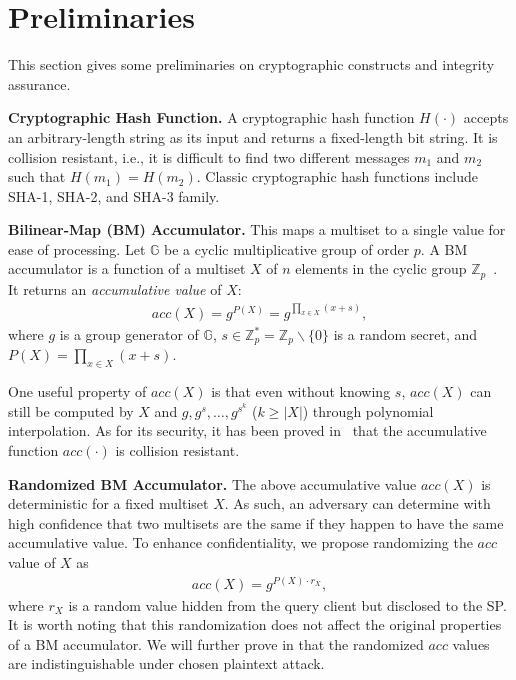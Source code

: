 \section{Preliminaries}\label{sec:aggregate-queries:prelim}

This section gives some preliminaries on cryptographic constructs and integrity assurance.

\textbf{Cryptographic Hash Function.}
A cryptographic hash function $H(\cdot)$ accepts an arbitrary-length string as its input and returns a fixed-length bit string. It is collision resistant, i.e., it is difficult to find two different messages $m_1$ and $m_2$ such that $H(m_1) = H(m_2)$. Classic cryptographic hash functions include SHA-1, SHA-2, and SHA-3 family.

\textbf{Bilinear-Map (BM) Accumulator.} This maps a multiset to a single value for ease of processing. Let $\mathbb{G}$ be a cyclic multiplicative group of order $p$. A BM accumulator is a function of a multiset $X$ of $n$ elements in the cyclic group $\mathbb{Z}_p$~\cite{10.1007/978-3-540-30574-3_19}. It returns an \emph{accumulative value} of $X$:
\begin{align}
  acc(X) = g^{P(X)} = g^{\prod_{x\in{X}}{(x+s)}},
\end{align}
where $g$ is a group generator of $\mathbb{G}$, $s \in \mathbb{Z}_p^* = \mathbb{Z}_p\backslash\{0\}$ is a random secret, and $P(X) = \prod_{x\in{X}}{(x+s)}$.

One useful property of $acc(X)$ is that even without knowing $s$, $acc(X)$ can still be computed by $X$ and $g, g^s, \dots, g^{s^k}$ ($k \ge |X|$) through polynomial interpolation. As for its security, it has been proved in~\cite{10.1007/s00453-014-9968-3} that the accumulative function $acc(\cdot)$ is collision resistant.

\textbf{Randomized BM Accumulator.} The above accumulative value $acc(X)$ is deterministic for a fixed multiset $X$. As such, an adversary can determine with high confidence that two multisets are the same if they happen to have the same accumulative value. To enhance confidentiality, we propose randomizing the $acc$ value of $X$ as
\begin{align}
  acc(X) = g^{P(X) \cdot r_X},\label{eqn:aggregate-queries:random-bm}
\end{align}
where $r_X$ is a random value hidden from the query client but disclosed to the SP\@. It is worth noting that this randomization does not affect the original properties of a BM accumulator. We will further prove in  that the randomized $acc$ values are indistinguishable under chosen plaintext attack.

